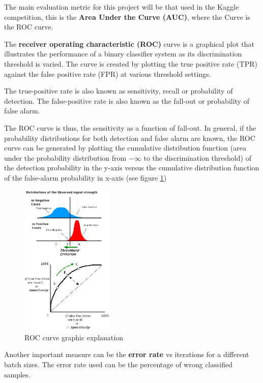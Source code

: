 \documentclass[]{article}
\begin{document}
The main evaluation metric for this project will be that used in the Kaggle competition, this is the \textbf{Area Under the Curve (AUC)}, where the Curve is the ROC curve.

The \textbf{receiver operating characteristic (ROC)} curve is a graphical plot that illustrates the performance of a binary classifier system as its discrimination threshold is varied. The curve is created by plotting the true positive rate (TPR) against the false positive rate (FPR) at various threshold settings.

The true-positive rate is also known as sensitivity, recall or probability of detection. The false-positive rate is also known as the fall-out or probability of false alarm. 

The ROC curve is thus, the sensitivity as a function of fall-out. In general, if the probability distributions for both detection and false alarm are known, the ROC curve can be generated by plotting the cumulative distribution function (area under the probability distribution from $-\infty$  to the discrimination threshold) of the detection probability in the y-axis versus the cumulative distribution function of the false-alarm probability in x-axis (see figure \ref{img:ROC})\cite{wikiROC}

\begin{figure}[htpb!]
\centering
\includegraphics[width= 0.4\textwidth]{images/ROCfig}
\caption{ROC curve graphic explanation \cite{wikiwand} \label{img:ROC}}
\end{figure}

Another important measure can be the \textbf{error rate} vs iterations for a different batch sizes. The error rate used can be the percentage of wrong classified samples.
\end{document}

